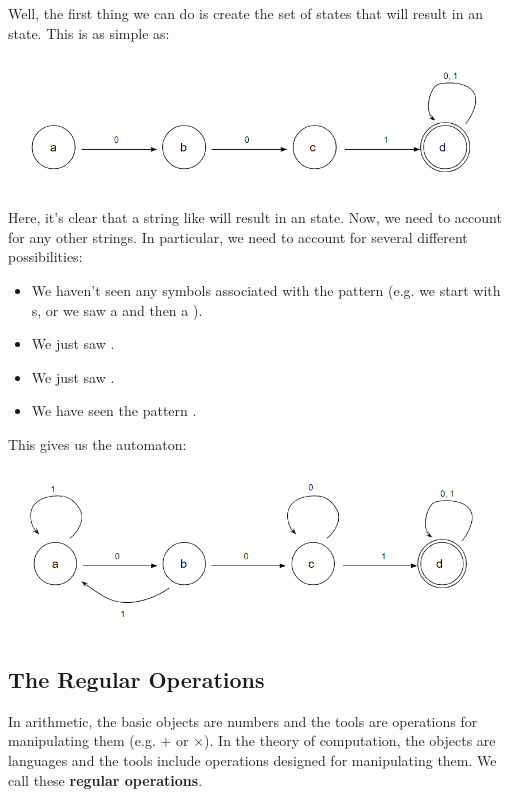\documentclass[letterpaper]{article}
\begin{document}
Well, the first thing we can do is create the set of states that will result in an  state. This is as simple as:
\begin{center}
    \includegraphics[scale=0.6]{assets/state_1.png}
\end{center}
Here, it's clear that a string like  will result in an  state. Now, we need to account for any other strings. In particular, we need to account for several different possibilities:
\begin{itemize}
    \item We haven't seen any symbols associated with the pattern (e.g. we start with s, or we saw a  and then a ). 
    \item We just saw .
    \item We just saw .
    \item We have seen the pattern .
\end{itemize}
This gives us the automaton:
\begin{center}
    \includegraphics[scale=0.6]{assets/state_2.png}
\end{center}

\subsection{The Regular Operations}
In arithmetic, the basic objects are numbers and the tools are operations for manipulating them (e.g. $+$ or $\times$). In the theory of computation, the objects are languages and the tools include operations designed for manipulating them. We call these \textbf{regular operations}.
\end{document}
